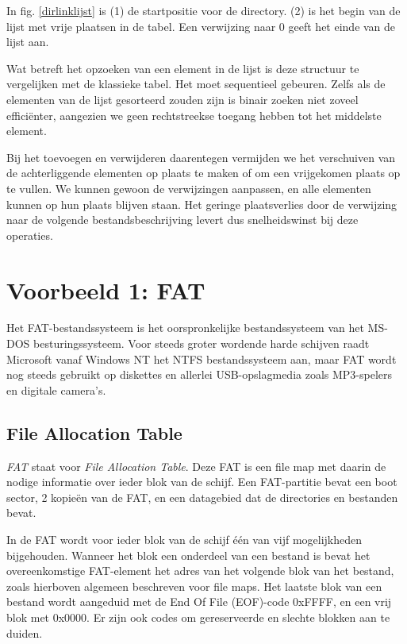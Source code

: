 In fig. \ref{dirlinklijst} is (1) de startpositie voor de directory. (2) is het begin van de lijst met vrije plaatsen in de tabel. Een verwijzing naar 0 geeft het einde van de lijst aan.

Wat betreft het opzoeken van een element in de lijst is deze
structuur te vergelijken met de klassieke tabel. Het moet sequentieel
gebeuren. Zelfs als de elementen van de lijst gesorteerd zouden zijn
is binair zoeken niet zoveel effici\"enter, aangezien we geen
rechtstreekse toegang hebben tot het middelste element.

Bij het toevoegen en verwijderen daarentegen vermijden we het
verschuiven van de achterliggende elementen op plaats te maken of om
een vrijgekomen plaats op te vullen. We kunnen gewoon de verwijzingen
aanpassen, en alle elementen kunnen op hun plaats blijven staan. Het
geringe plaatsverlies door de verwijzing naar de volgende
bestandsbeschrijving levert dus snelheidswinst bij deze
operaties.

\section{Voorbeeld 1: FAT}

Het FAT-bestandssysteem is het oorspronkelijke bestandssysteem van
het MS-DOS besturingssysteem. Voor steeds groter wordende harde schijven
raadt Microsoft vanaf Windows NT het NTFS bestandssysteem aan, maar FAT
wordt nog steeds gebruikt op diskettes en allerlei USB-opslagmedia zoals
MP3-spelers en digitale camera's.

\subsection{File Allocation Table}

\emph{FAT} staat voor \emph{File Allocation
Table}. Deze FAT is een file map met daarin de nodige
informatie over ieder blok van de schijf. Een FAT-partitie bevat een
boot sector, 2 kopie\"en van de FAT, en een datagebied dat de
directories en bestanden bevat.

In de FAT wordt voor ieder blok van de schijf \'e\'en van vijf
mogelijkheden bijgehouden. Wanneer het blok een onderdeel van een
bestand is bevat het overeenkomstige FAT-element het adres van het
volgende blok van het bestand, zoals hierboven algemeen beschreven
voor file maps. Het laatste blok van een bestand wordt aangeduid met
de End Of File (EOF)-code 0xFFFF, en een vrij blok met 0x0000. Er zijn
ook codes om gereserveerde en slechte blokken aan te duiden.

